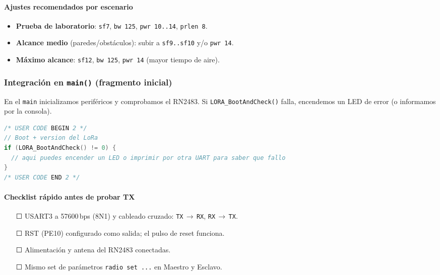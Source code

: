 \documentclass[a4paper,12pt]{article}
\begin{document}
\paragraph{Ajustes recomendados por escenario}
\begin{itemize}
  \item \textbf{Prueba de laboratorio}: \texttt{sf7}, \texttt{bw 125}, \texttt{pwr 10..14}, \texttt{prlen 8}.
  \item \textbf{Alcance medio} (paredes/obstáculos): subir a \texttt{sf9..sf10} y/o \texttt{pwr 14}.
  \item \textbf{Máximo alcance}: \texttt{sf12}, \texttt{bw 125}, \texttt{pwr 14} (mayor tiempo de aire).
\end{itemize}

\subsubsection{Integración en \texttt{main()} (fragmento inicial)}
En el \texttt{main} inicializamos periféricos y comprobamos el RN2483. Si \texttt{LORA\_BootAndCheck()} falla, encendemos un LED de error (o informamos por la consola).

\begin{lstlisting}[language=C, caption={Fragmento didáctico del main: boot + verificación}, label={lst:main_boot}]
/* USER CODE BEGIN 2 */
// Boot + version del LoRa
if (LORA_BootAndCheck() != 0) {
  // aqui puedes encender un LED o imprimir por otra UART para saber que fallo
}
/* USER CODE END 2 */
\end{lstlisting}

\paragraph{Checklist rápido antes de probar TX}
\begin{itemize}
  \item[$\Square$] USART3 a 57600\,bps (8N1) y cableado cruzado: \texttt{TX}\,$\rightarrow$\,\texttt{RX}, \texttt{RX}\,$\rightarrow$\,\texttt{TX}.
  \item[$\Square$] RST (PE10) configurado como salida; el pulso de reset funciona.
  \item[$\Square$] Alimentación y antena del RN2483 conectadas.
  \item[$\Square$] Mismo set de parámetros \texttt{radio set ...} en Maestro y Esclavo.
\end{itemize}
\end{document}
